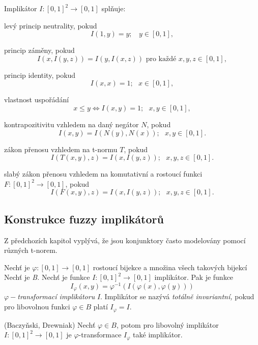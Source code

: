 \begin{definition}
\cite{hlinena}
Implik\'ator $I:[0,1]^2 \rightarrow [0,1]$ spl\v nuje:
\begin{enumerate}
\item[(NP)] levý princip neutrality, pokud
$$I(1,y)=y; ~~~~y \in [0,1],$$
\item[(EP)] princip z\'aměny, pokud
$$I(x,I(y,z))=I(y,I(x,z)) \mbox{  pro ka\v zd\'e   } x,y,z \in [0,1],$$
\item[(IP)] princip identity, pokud
$$I(x,x) = 1; ~~~ x \in [0,1], $$
\item[(OP)] vlastnost uspořádání
$$x \leq y \iff I(x,y) =1; ~~~ x,y \in [0,1],$$
\item[(CP)] kontrapozitivitu vzhledem na dan\'y neg\'ator $N$, pokud
$$ I(x,y)=I(N(y),N(x)); ~~~ x,y \in [0,1].$$
 {\item[(LI)] z\'akon přenosu  vzhledem na  t-normu $T$, pokud
$$I(T(x, y), z) = I(x, I(y, z)); ~~~ x,y,z \in  [0, 1].$$
\item[(WLI)]  slab\'y z\'akon přenosu vzhledem na komutativní a
rostoucí funkci $F:
[0,1]^2 \to [0, 1]$, pokud
$$I(F(x, y), z) = I(x, I(y, z)); ~~~  x,y,z \in  [0, 1].$$}
\end{enumerate}
\end{definition}

\subsection{Konstrukce fuzzy implikátor\r u}
Z předchozích kapitol vyplývá, že jsou konjunktory často modelovány pomocí r\r uzných t-norem. 

\begin{definition}
    Nech\v t je $\varphi:[0,1] \rightarrow [0,1]$  rostoucí
    bijekce a množina všech takových bijekcí Nech\v t je {\em B.} Nech\v t je funkce
    $I:[0,1]^2\rightarrow [0,1]$ 
    implikátor.
    Pak je funkce
    $$I_\varphi(x,y)=\varphi^{-1}(I(\varphi (x), \varphi (y)))$$
    $\varphi-${\em transformací implikátoru} $I.$ Implikátor se nazývá
    {\em totálně invariantní,} pokud pro libovolnou funkci $\varphi \in B$ platí $I_\varphi=I.$\\
\end{definition}

\begin{sentence}(Baczy\v nski, Drewniak)
    Nech\v t $\varphi \in B$, potom pro libovolný implikátor $I: [0,1]^2 \rightarrow [0,1]$ je $\varphi$-transformace $I_\varphi$ také implikátor.
\end{sentence}

